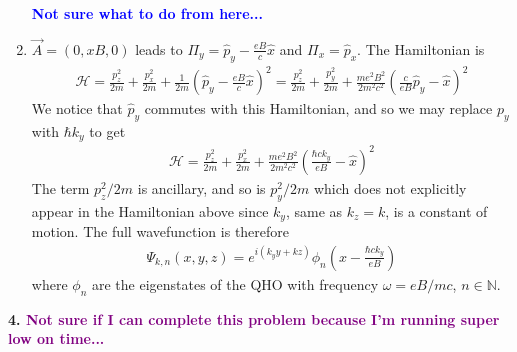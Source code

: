 \documentclass{article}
\theoremstyle{definition}
\newcommand{\ham}{\mathcal{H}}
\newcommand{\f}[2]{\frac{#1}{#2}}
\newcommand{\lp}{\left(}
\newcommand{\rp}{\right)}
\begin{document}
\begin{enumerate}[label=(\alph*)]
	\textbf{\textcolor{blue}{Not sure what to do from here...}}
	
	
	
	\item $\vec{A} = (0,xB,0)$ leads to $\Pi_y = \hat{p}_y - \f{eB}{c}\hat{x}$ and $\Pi_x = \hat{p}_x$. The Hamiltonian is 
	\begin{align*}
	\ham = \f{p_z^2}{2m} + \f{p_x^2}{2m} + \f{1}{2m}\lp \hat{p}_y - \f{eB}{c}\hat{x} \rp^2 =  \f{p_z^2}{2m} + \f{p_y^2}{2m} + \f{m e^2 B^2}{2m^2c^2}\lp \f{c}{eB}\hat{p}_y - \hat{x} \rp^2
	\end{align*}
	We notice that $\hat{p}_y$ commutes with this Hamiltonian, and so we may replace $p_y$ with $\hbar k_y$ to get
	\begin{align*}
	\ham =  \f{p_z^2}{2m} + \f{p_x^2}{2m} + \f{m e^2 B^2}{2m^2c^2}\lp \f{\hbar c k_y}{eB} - \hat{x} \rp^2
	\end{align*}
	The term $p_z^2/2m$ is ancillary, and so is $p_y^2/2m$ which does not explicitly appear in the Hamiltonian above since $k_y$, same as $k_z=k$, is a constant of motion. The full wavefunction is therefore
	\begin{align*}
	\Psi_{k,n}(x,y,z) = e^{i(k_y y + k z )} \phi_n\lp x - \f{\hbar c k_y}{eB} \rp
	\end{align*}
	where $\phi_n$ are the eigenstates of the QHO with frequency $\omega = eB/mc$, $n\in \mathbb{N}$. 
	
	 
\end{enumerate}


\noindent \textbf{4. \textbf{\textcolor{purple}{Not sure if I can complete this problem because I'm running super low on time...}}}
\end{document}

